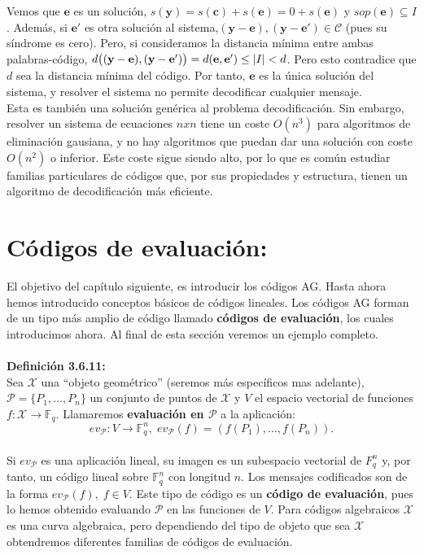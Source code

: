 \documentclass[11pt,spanish]{book}
\begin{document}
Vemos que $\mathbf{e}$ es un solución, $s(\mathbf{y})=s(\mathbf{c})+s(\mathbf{e})=0+s(\mathbf{e})$ y $sop(\mathbf{e})\subseteq I$. Además, si $\mathbf{e}'$ es otra solución al sistema,$(\mathbf{y}-\mathbf{e}), (\mathbf{y}-\mathbf{e}')\in \mathcal{C}$ (pues su síndrome es cero). Pero, si consideramos la distancia mínima entre ambas palabras-código, $d\big{(}(\mathbf{y}-\mathbf{e}), (\mathbf{y}-\mathbf{e}')\big{)}=d(\mathbf{e},\mathbf{e'})\leq |I|<d$. Pero esto contradice que $d$ sea la distancia mínima del código. Por tanto, $\mathbf{e}$ es la única solución del sistema, y resolver el sistema no permite decodificar cualquier mensaje.\\

Esta es también una solución genérica al problema decodificación. Sin embargo, resolver un sistema de ecuaciones $nxn$ tiene un coste $O(n^3)$ para algoritmos de eliminación gausiana, y no hay algoritmos que puedan dar una solución con coste $O(n^2)$ o inferior. Este coste sigue siendo alto, por lo que es común estudiar familias particulares de códigos que, por sus propiedades y estructura, tienen un algoritmo de decodificación más eficiente. 
\section{Códigos de evaluación:}
El objetivo del capítulo siguiente, es introducir los códigos AG. Hasta ahora hemos introducido conceptos básicos de códigos lineales. Los códigos AG forman de un tipo más amplio de código llamado \textbf{códigos de evaluación}, los cuales introducimos ahora. Al final de esta sección veremos un ejemplo completo.\\
\\ \textbf{Definición 3.6.11: }\\

Sea $\mathcal{X}$ una ``objeto geométrico'' (seremos más específicos mas adelante), $\mathcal{P}=\{P_{1},\ldots,P_{n}\}$ un conjunto de puntos de $\mathcal{X}$ y $V$ el espacio vectorial de funciones $f:\mathcal{X}\rightarrow \mathbb{F}_{q}$. Llamaremos \textbf{evaluación en $\mathcal{P}$} a la aplicación:
$$ev_{\mathcal{P}}:V\longrightarrow\mathbb{F}_{q}^{n},\;ev_{\mathcal{P}}(f)=(f(P_{1}),\ldots,f(P_{n})). $$\\

Si $ev_{\mathcal{P}}$ es una aplicación lineal, su imagen es un subespacio vectorial de $F_{q}^{n}$ y, por tanto, un código lineal sobre $\mathbb{F}_{q}^{n}$ con longitud $n$. Los mensajes codificados son de la forma $ev_{\mathcal{P}}(f),\; f\in V$. Este tipo de código es un \textbf{código de evaluación}, pues lo hemos obtenido evaluando $\mathcal{P}$ en las funciones de $V$. Para códigos algebraicos $\mathcal{X}$ es una curva algebraica, pero dependiendo del tipo de objeto que sea $\mathcal{X}$ obtendremos diferentes familias de códigos de evaluación.\\
\end{document}
